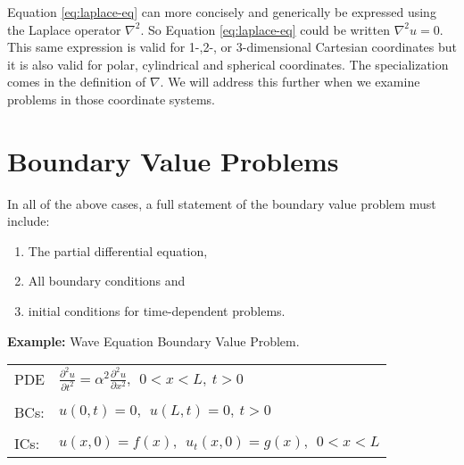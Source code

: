 Equation \ref{eq:laplace-eq} can more concisely and generically be expressed using the Laplace operator $\nabla^2$.
So Equation \ref{eq:laplace-eq} could be written $\nabla^2 u = 0$.  This same expression is valid for 1-,2-, or 3-dimensional Cartesian coordinates but it is also valid for polar, cylindrical and spherical coordinates.  The specialization comes in the definition of $\nabla$.  We will address this further when we examine problems in those coordinate systems.

\section{Boundary Value Problems}
In all of the above cases, a full statement of the boundary value problem must include:
\begin{enumerate}
\item The partial differential equation,
\item All boundary conditions and
\item initial conditions for time-dependent problems.
\end{enumerate}

\vspace{0.5cm}

\noindent\textbf{Example:} Wave Equation Boundary Value Problem.
\begin{table}
\begin{tabular}{l l}
PDE & $ \frac{\partial^2 u}{\partial t^2} = \alpha^2 \frac{\partial^2 u}{\partial x^2}, \ \ 0<x<L, \ t>0$\\
 & \\
BCs: & $u(0,t) = 0, \ \ u(L,t) = 0, \ t>0$ \\
 & \\
ICs: & $u(x,0)=f(x), \ \ u_t(x,0)=g(x), \ \ 0<x<L$ \\
\end{tabular}
\end{table}

